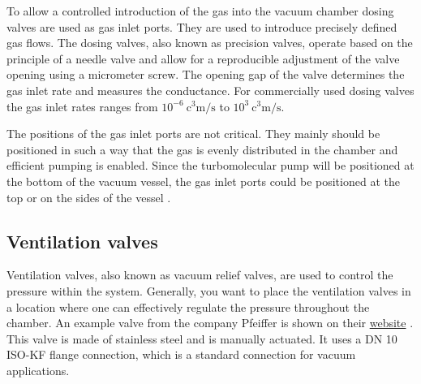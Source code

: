 To allow a controlled introduction of the gas into the vacuum chamber dosing valves are used as gas inlet ports.
They are used to introduce precisely defined gas flows.
The dosing valves, also known as precision valves, operate based on the principle of a needle valve and allow for a reproducible adjustment of the valve opening using a micrometer screw.
The opening gap of the valve determines the gas inlet rate and measures the conductance.
For commercially used dosing valves the gas inlet rates ranges from $10^{-6}~\si{\cubic\centi\meter\per\second}$ to $10^{3}~\si{\cubic\centi\meter\per\second}$.

The positions of the gas inlet ports are not critical.
They mainly should be positioned in such a way that the gas is evenly distributed in the chamber and efficient pumping is enabled.
Since the turbomolecular pump will be positioned at the bottom of the vacuum vessel, the gas inlet ports could be positioned at the top or on the sides of the vessel \cite{Wutz2000}.

\subsection{Ventilation valves}
Ventilation valves, also known as vacuum relief valves, are used to control the pressure within the system.
Generally, you want to place the ventilation valves in a location where one can effectively regulate the pressure throughout the chamber.
An example valve from the company Pfeiffer is shown on their \href{https://www.pfeiffer- vacuum.com/global/en/shop/products/d75b9798-
    4ae8-408d-b1fb-970fa22fa890}{website} \cite{pfeiffer_venting_valve}.
This valve is made of stainless steel and is manually actuated.
It uses a DN 10 ISO-KF flange connection, which is a standard connection for vacuum applications.


